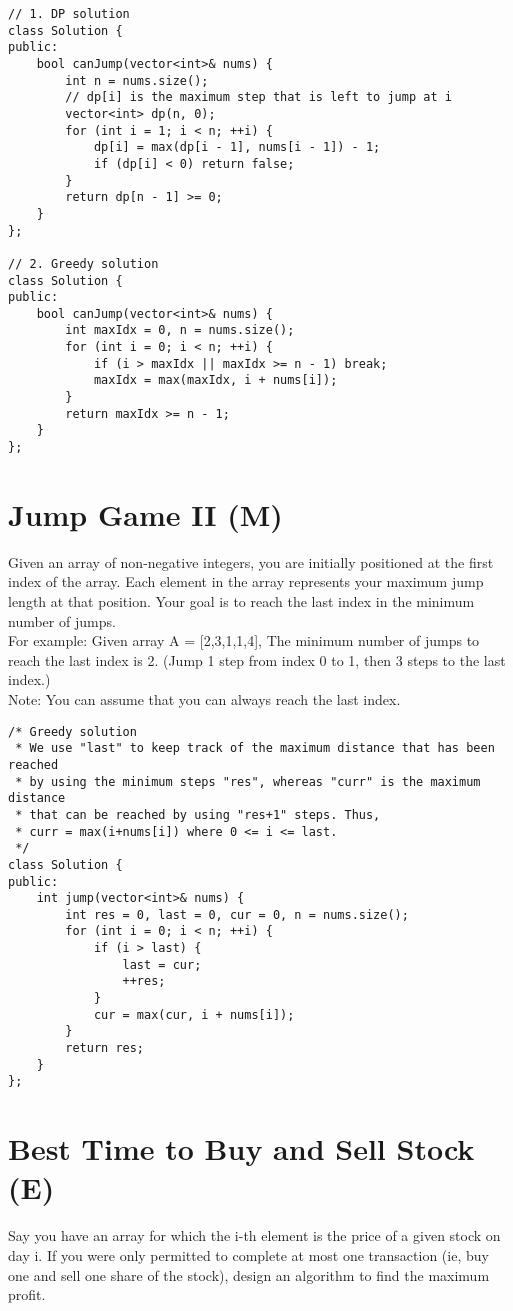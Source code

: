 \begin{lstlisting}
// 1. DP solution
class Solution {
public:
    bool canJump(vector<int>& nums) {
        int n = nums.size();
        // dp[i] is the maximum step that is left to jump at i
        vector<int> dp(n, 0);
        for (int i = 1; i < n; ++i) {
            dp[i] = max(dp[i - 1], nums[i - 1]) - 1;
            if (dp[i] < 0) return false;
        }
        return dp[n - 1] >= 0;
    }
};

// 2. Greedy solution
class Solution {
public:
    bool canJump(vector<int>& nums) {
        int maxIdx = 0, n = nums.size();
        for (int i = 0; i < n; ++i) {
            if (i > maxIdx || maxIdx >= n - 1) break;
            maxIdx = max(maxIdx, i + nums[i]);
        }
        return maxIdx >= n - 1;
    }
};
\end{lstlisting}


\section{Jump Game II (M)}
Given an array of non-negative integers, you are initially positioned at the first index of the array. Each element in the array represents your maximum jump length at that position. Your goal is to reach the last index in the minimum number of jumps.\\

For example:
Given array A = [2,3,1,1,4],
The minimum number of jumps to reach the last index is 2. (Jump 1 step from index 0 to 1, then 3 steps to the last index.)\\

Note:
You can assume that you can always reach the last index.\\

\begin{lstlisting}
/* Greedy solution
 * We use "last" to keep track of the maximum distance that has been reached
 * by using the minimum steps "res", whereas "curr" is the maximum distance
 * that can be reached by using "res+1" steps. Thus,
 * curr = max(i+nums[i]) where 0 <= i <= last.
 */
class Solution {
public:
    int jump(vector<int>& nums) {
        int res = 0, last = 0, cur = 0, n = nums.size();
        for (int i = 0; i < n; ++i) {
            if (i > last) {
                last = cur;
                ++res;
            }
            cur = max(cur, i + nums[i]);
        }
        return res;
    }
};
\end{lstlisting}


\section{Best Time to Buy and Sell Stock (E)}
Say you have an array for which the i-th element is the price of a given stock on day i. If you were only permitted to complete at most one transaction (ie, buy one and sell one share of the stock), design an algorithm to find the maximum profit.\\

